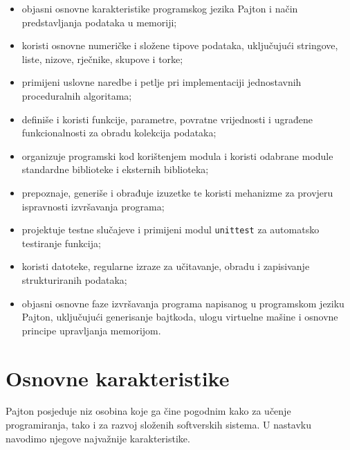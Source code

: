\begin{itemize}
	\item objasni osnovne karakteristike programskog jezika Pajton i
	način predstavljanja podataka u memoriji;
	
	\item koristi osnovne numeričke i složene tipove podataka, uključujući
	stringove, liste, nizove, rječnike, skupove i torke;
	
	\item primijeni uslovne naredbe i petlje pri implementaciji
	jednostavnih proceduralnih algoritama;
	
	\item definiše i koristi funkcije, parametre, povratne vrijednosti i
	ugrađene funkcionalnosti za obradu kolekcija podataka;
	
	\item organizuje programski kod korištenjem modula i koristi odabrane
	module standardne biblioteke i eksternih biblioteka;
	
	\item prepoznaje, generiše i obrađuje izuzetke te koristi mehanizme za
	provjeru ispravnosti izvršavanja programa;

	\item projektuje testne slučajeve i primijeni modul \texttt{unittest} za automatsko testiranje funkcija;
	
	\item koristi datoteke,  regularne izraze za učitavanje,
	obradu i zapisivanje strukturiranih podataka;
	
	\item objasni osnovne faze izvršavanja programa napisanog u programskom jeziku Pajton, uključujući
	generisanje bajtkoda, ulogu virtuelne mašine i osnovne principe
	upravljanja memorijom.
\end{itemize}

\section{Osnovne karakteristike}

Pajton posjeduje niz osobina koje ga čine pogodnim kako za učenje programiranja, tako i za razvoj složenih softverskih sistema. U nastavku navodimo njegove najvažnije karakteristike.

